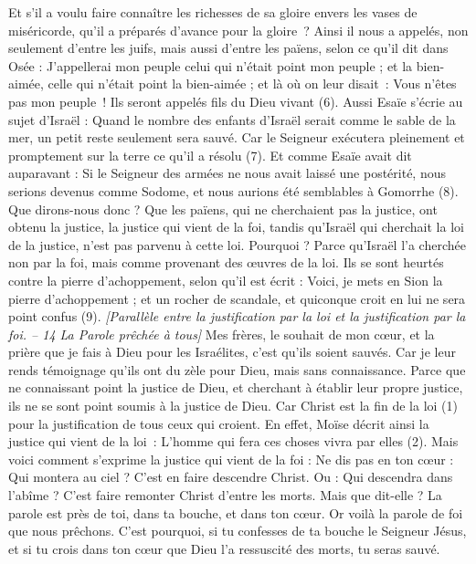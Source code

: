 \begin{multicols}{2}
Et s’il a voulu faire connaître les richesses de sa gloire envers les vases de miséricorde, qu'il a préparés d’avance pour la gloire ?
Ainsi il nous a appelés, non seulement d'entre les juifs, mais aussi d'entre les païens,
selon ce qu'il dit dans Osée : J'appellerai mon peuple celui qui n'était point mon peuple ; et la bien-aimée, celle qui n'était point la bien-aimée ;
et là où on leur disait : Vous n’êtes pas mon peuple ! Ils seront appelés fils du Dieu vivant (6).
Aussi Esaïe s'écrie au sujet d'Israël : Quand le nombre des enfants d'Israël serait comme le sable de la mer, un petit reste seulement sera sauvé.
Car le Seigneur exécutera pleinement et promptement sur la terre ce qu’il a résolu (7).
Et comme Esaïe avait dit auparavant : Si le Seigneur des armées ne nous avait laissé une postérité, nous serions devenus comme Sodome, et nous aurions été semblables à Gomorrhe (8).
Que dirons-nous donc ? Que les païens, qui ne cherchaient pas la justice, ont obtenu la justice, la justice qui vient de la foi,
tandis qu’Israël qui cherchait la loi de la justice, n'est pas parvenu à cette loi.
Pourquoi ? Parce qu’Israël l’a cherchée non par la foi, mais comme provenant des œuvres de la loi. Ils se sont heurtés contre la pierre d'achoppement,
selon qu’il est écrit : Voici, je mets en Sion la pierre d'achoppement ; et un rocher de scandale, et quiconque croit en lui ne sera point confus (9).
\textit{[Parallèle entre la justification par la loi et la justification par la foi. – 14 La Parole prêchée à tous]}
\VerseOne{}Mes frères, le souhait de mon cœur, et la prière que je fais à Dieu pour les Israélites, c'est qu'ils soient sauvés.
Car je leur rends témoignage qu'ils ont du zèle pour Dieu, mais sans connaissance.
Parce que ne connaissant point la justice de Dieu, et cherchant à établir leur propre justice, ils ne se sont point soumis à la justice de Dieu.
Car Christ est la fin de la loi (1) pour la justification de tous ceux qui croient.
En effet, Moïse décrit ainsi la justice qui vient de la loi : L'homme qui fera ces choses vivra par elles (2).
Mais voici comment s'exprime la justice qui vient de la foi : Ne dis pas en ton cœur : Qui montera au ciel ? C’est en faire descendre Christ.
Ou : Qui descendra dans l'abîme ? C’est faire remonter Christ d’entre les morts.
Mais que dit-elle ? La parole est près de toi, dans ta bouche, et dans ton cœur. Or voilà la parole de foi que nous prêchons.
C'est pourquoi, si tu confesses de ta bouche le Seigneur Jésus, et si tu crois dans ton cœur que Dieu l'a ressuscité des morts, tu seras sauvé.

\end{multicols}

